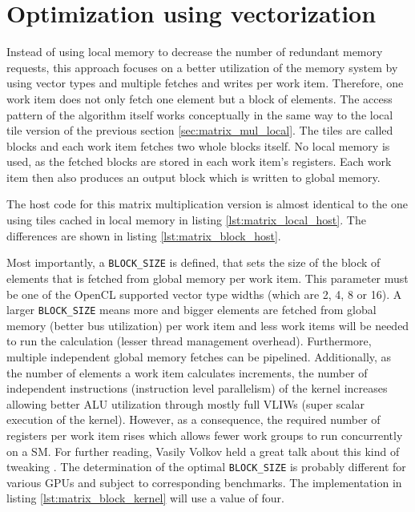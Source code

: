 \section{Optimization using vectorization}
\label{sec:matrix_mul_vec}
Instead of using local memory to decrease the number of redundant memory requests, this approach focuses on a better utilization of the memory system by using vector types and multiple fetches and writes per work item. Therefore, one work item does not only fetch one element but a block of elements.
The access pattern of the algorithm itself works conceptually in the same way to the local tile version of the previous section \ref{sec:matrix_mul_local}. The tiles are called blocks and each work item fetches two whole blocks itself. No local memory is used, as the fetched blocks are stored in each work item's registers. Each work item then also produces an output block which is written to global memory.

The host code for this matrix multiplication version is almost identical to the one using tiles cached in local memory in listing \ref{lst:matrix_local_host}. The differences are shown in listing \ref{lst:matrix_block_host}.



Most importantly, a \lstinline!BLOCK_SIZE! is defined, that sets the size of the block of elements that is fetched from global memory per work item. This parameter must be one of the OpenCL supported vector type widths (which are 2, 4, 8 or 16). A larger \lstinline!BLOCK_SIZE! means more and bigger elements are fetched from global memory (better bus utilization) per work item and less work items will be needed to run the calculation (lesser thread management overhead). Furthermore, multiple independent global memory fetches can be pipelined. Additionally, as the number of elements a work item calculates increments, the number of independent instructions (instruction level parallelism) of the kernel increases allowing better ALU utilization through mostly full VLIWs (super scalar execution of the kernel). However, as a consequence, the required number of registers per work item rises which allows fewer work groups to run concurrently on a SM. For further reading, Vasily Volkov held a great talk about this kind of tweaking \cite{volkov}.
The determination of the optimal \lstinline!BLOCK_SIZE! is probably different for various GPUs and subject to corresponding benchmarks. The implementation in listing \ref{lst:matrix_block_kernel} will use a value of four.
 
